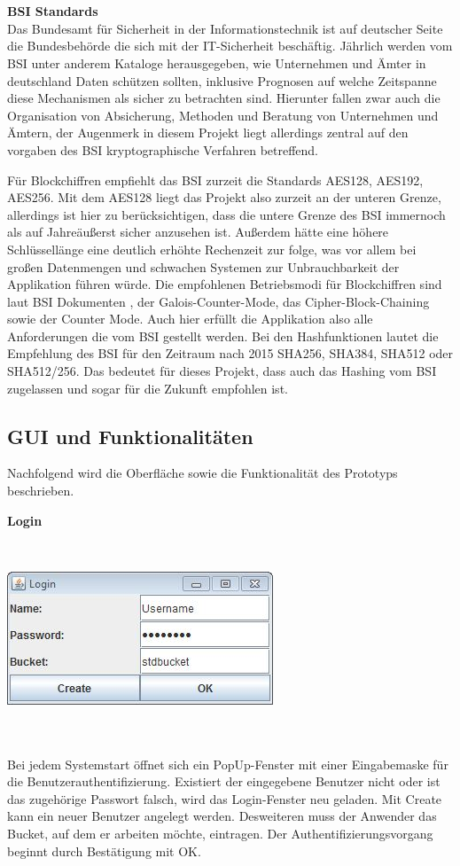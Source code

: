 \documentclass[12pt,a4paper,bibliography=totocnumbered,listof=totocnumbered]{scrartcl}
\begin{document}
\\\\\textbf{BSI Standards}\\
Das Bundesamt für Sicherheit in der Informationstechnik ist auf deutscher Seite die Bundesbehörde die sich mit der IT-Sicherheit beschäftig. Jährlich werden vom BSI unter anderem Kataloge herausgegeben, wie Unternehmen und Ämter in deutschland Daten schützen sollten, inklusive Prognosen auf welche Zeitspanne diese Mechanismen als sicher zu betrachten sind. Hierunter fallen zwar auch die Organisation von Absicherung, Methoden und Beratung von Unternehmen und Ämtern, der Augenmerk in diesem Projekt liegt allerdings zentral auf den vorgaben des BSI kryptographische Verfahren betreffend.

Für Blockchiffren empfiehlt das BSI zurzeit die Standards AES128, AES192, AES256. Mit dem AES128 liegt das Projekt also zurzeit an der unteren Grenze, allerdings ist hier zu berücksichtigen, dass die untere Grenze des BSI immernoch als auf Jahreäußerst sicher anzusehen ist. Außerdem hätte eine höhere Schlüssellänge eine deutlich erhöhte Rechenzeit zur folge, was vor allem bei großen Datenmengen und schwachen Systemen zur Unbrauchbarkeit der Applikation führen würde. Die empfohlenen Betriebsmodi für Blockchiffren sind laut BSI Dokumenten , der Galois-Counter-Mode, das Cipher-Block-Chaining sowie der Counter Mode. Auch hier erfüllt die Applikation also alle Anforderungen die vom BSI gestellt werden. Bei den Hashfunktionen lautet die Empfehlung des BSI für den Zeitraum nach 2015 SHA256, SHA384, SHA512 oder SHA512/256. Das bedeutet für dieses Projekt, dass auch das Hashing vom BSI zugelassen und sogar für die Zukunft empfohlen ist.\cite{12}\cite{13}

\subsection{GUI und Funktionalitäten}\label{GUIV}
Nachfolgend wird die Oberfläche sowie die Funktionalität des Prototyps beschrieben.

\textbf{Login}

\vspace{1em}
$\;$\\
\begin{minipage}{\linewidth}
	\centering
	\includegraphics[width=0.4\linewidth]{Login.jpg}
	\label{Login}
\end{minipage}
\\\\Bei jedem Systemstart öffnet sich ein PopUp-Fenster mit einer Eingabemaske für die Benutzerauthentifizierung. Existiert der eingegebene Benutzer nicht oder ist das zugehörige Passwort falsch, wird das Login-Fenster neu geladen. Mit Create kann ein neuer Benutzer angelegt werden. Desweiteren muss der Anwender das Bucket, auf dem er arbeiten möchte, eintragen. Der Authentifizierungsvorgang beginnt durch Bestätigung mit OK.
\end{document}
